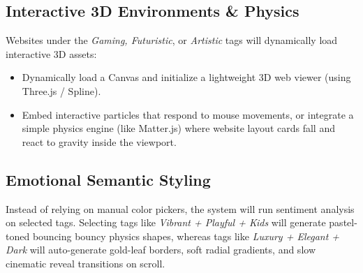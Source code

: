 \documentclass[11pt,a4paper]{article}
\begin{document}
\subsection{Interactive 3D Environments \& Physics}
Websites under the \textit{Gaming, Futuristic}, or \textit{Artistic} tags will dynamically load interactive 3D assets:
\begin{itemize}
    \item Dynamically load a Canvas and initialize a lightweight 3D web viewer (using Three.js / Spline).
    \item Embed interactive particles that respond to mouse movements, or integrate a simple physics engine (like Matter.js) where website layout cards fall and react to gravity inside the viewport.
\end{itemize}

\subsection{Emotional Semantic Styling}
Instead of relying on manual color pickers, the system will run sentiment analysis on selected tags. Selecting tags like \textit{Vibrant + Playful + Kids} will generate pastel-toned bouncing bouncy physics shapes, whereas tags like \textit{Luxury + Elegant + Dark} will auto-generate gold-leaf borders, soft radial gradients, and slow cinematic reveal transitions on scroll.
\end{document}
